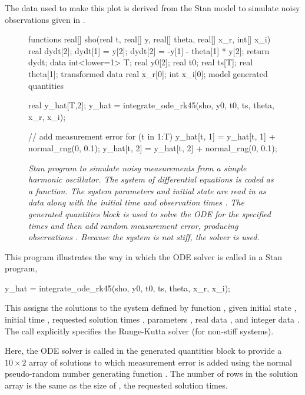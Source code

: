 The data used to make this plot is derived from the Stan model to
simulate noisy observations given in .
%
\begin{figure}
\begin{stancode}
functions {
  real[] sho(real t,
             real[] y, 
             real[] theta,
             real[] x_r,
             int[] x_i) {
    real dydt[2];
    dydt[1] = y[2];
    dydt[2] = -y[1] - theta[1] * y[2];
    return dydt;
  }
}
data {
  int<lower=1> T;
  real y0[2];
  real t0;
  real ts[T];
  real theta[1];
}
transformed data {
  real x_r[0];
  int x_i[0];
}
model {
}
generated quantities {
  real y_hat[T,2];
  y_hat = integrate_ode_rk45(sho, y0, t0, ts, theta, x_r, x_i);

  // add measurement error
  for (t in 1:T) {
    y_hat[t, 1] = y_hat[t, 1] + normal_rng(0, 0.1);
    y_hat[t, 2] = y_hat[t, 2] + normal_rng(0, 0.1);
  }
}
\end{stancode}
\vspace*{-0.2in}
\caption{\small\it Stan program to simulate noisy measurements from a
  simple harmonic oscillator.  The system of differential equations is
  coded as a function.  The system parameters  and initial
  state  are read in as data along with the initial time
   and observation times . The generated quantities
  block is used to solve the ODE for the specified times and then add
  random measurement error, producing observations .
  Because the system is not stiff, the  solver is used.}\label{sho-sim.figure}
\end{figure}

This program illustrates the way in which the ODE solver is called in
a Stan program,
%
\begin{stancode}
y_hat = integrate_ode_rk45(sho, y0, t0, ts, theta, x_r, x_i);
\end{stancode}
%
This assigns the solutions to the system defined by function
, given initial state , initial time ,
requested solution times , parameters , real data
, and integer data .  The call explicitly
specifies the Runge-Kutta solver (for non-stiff systems).

Here, the ODE solver is called in the generated quantities block to
provide a $10 \times 2$ array of solutions  to
which measurement error is added using the normal pseudo-random number
generating function .  The number of rows in the
solution array is the same as the size of , the requested
solution times.

